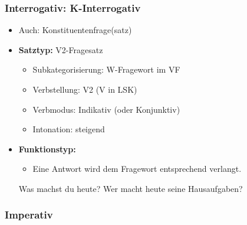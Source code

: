 \begin{frame}
\frametitle{Interrogativ: K-Interrogativ}

\begin{itemize}
	\item Auch: Konstituentenfrage(satz)
	\item \textbf{Satztyp:} V2-Fragesatz
	\begin{itemize}
		\item Subkategorisierung: W-Fragewort im VF
		\item Verbstellung: V2 (V in LSK)
		\item Verbmodus: Indikativ (oder Konjunktiv)
		\item Intonation: steigend
	\end{itemize}
	\item \textbf{Funktionstyp:}
	\begin{itemize}
		\item Eine Antwort wird dem Fragewort entsprechend verlangt.
	\end{itemize}
	
	\eal
	\ex Was machst du heute?
	\ex Wer macht heute seine Hausaufgaben?
	\zl
	
\end{itemize}

\nocite{MyP18e} \nocite{MyP18g} \nocite{MyP18i} \nocite{MyP18p}

\end{frame}


\subsubsection{Imperativ}



